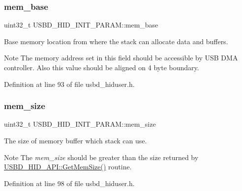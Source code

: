 \subsubsection{\texorpdfstring{mem\+\_\+base}{mem\_base}}
{\footnotesize\ttfamily uint32\+\_\+t U\+S\+B\+D\+\_\+\+H\+I\+D\+\_\+\+I\+N\+I\+T\+\_\+\+P\+A\+R\+A\+M\+::mem\+\_\+base}

Base memory location from where the stack can allocate data and buffers. \begin{DoxyNote}{Note}
The memory address set in this field should be accessible by U\+SB D\+MA controller. Also this value should be aligned on 4 byte boundary. 
\end{DoxyNote}


Definition at line 93 of file usbd\+\_\+hiduser.\+h.

\mbox{\label{struct_u_s_b_d___h_i_d___i_n_i_t___p_a_r_a_m_a79aeddb1f4f4c9d77cacd17cf6c26499}} 
\subsubsection{\texorpdfstring{mem\+\_\+size}{mem\_size}}
{\footnotesize\ttfamily uint32\+\_\+t U\+S\+B\+D\+\_\+\+H\+I\+D\+\_\+\+I\+N\+I\+T\+\_\+\+P\+A\+R\+A\+M\+::mem\+\_\+size}

The size of memory buffer which stack can use. \begin{DoxyNote}{Note}
The {\itshape mem\+\_\+size} should be greater than the size returned by \hyperlink{struct_u_s_b_d___h_i_d___a_p_i_a020839a4e29677899bb7a0a2c11b1252}{U\+S\+B\+D\+\_\+\+H\+I\+D\+\_\+\+A\+P\+I\+::\+Get\+Mem\+Size()} routine. 
\end{DoxyNote}


Definition at line 98 of file usbd\+\_\+hiduser.\+h.

\mbox{\label{struct_u_s_b_d___h_i_d___i_n_i_t___p_a_r_a_m_abe66157322df2a9f655708b8ae2795e9}} 
